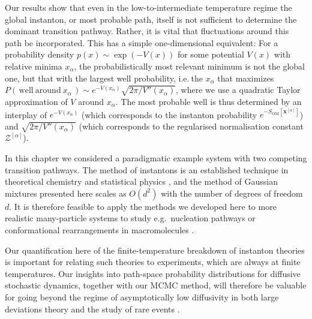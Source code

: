Our results show that even in the low-to-intermediate temperature
regime the global instanton, or most probable path, itself is not
sufficient to determine the dominant transition pathway. Rather, it
is vital that fluctuations around this path be incorporated. This
has a simple one-dimensional equivalent: For a probability density
$p(x)\sim\exp(-V(x))$ for some potential $V(x)$ with relative
minima $x_{\alpha}$, the probabilistically most relevant minimum
is not the global one, but that with the largest well probability,
i.e.$~$the $x_{\alpha}$ that maximizes $P(\,\mathrm{well~around~}x_{\alpha}\,)\sim e^{-V(x_{\alpha})}\sqrt{{2\pi}/{V''(x_{\alpha})}}$,
where we use a quadratic Taylor approximation of $V$ around $x_{\alpha}$.
The most probable well is thus determined by an interplay of $e^{-V(x_{\alpha})}$
(which corresponds to the instanton probability $e^{-S_{\text{OM}}[\mathbf{x}^{[\alpha]}]}$)
and $\sqrt{{2\pi}/{V''(x_{\alpha})}}$ (which corresponds to the regularised
normalisation constant $\mathcal{Z}^{[\alpha]}$).

In this chapter we considered a paradigmatic example system with
two competing transition pathways. The method of instantons is an
established technique in theoretical chemistry and statistical physics
\citep{eMinimumActionMethod2004a, weinanStringMethodStudy2002, grafke_instanton_2015, grafke_numerical_2019, schorlepp_gelfandyaglom_2021, dematteis_experimental_2019, ferreApproximateOptimalControls2021a, kikuchiRitzMethodTransition2020a, heymannGeometricMinimumAction2008a},
and the method of Gaussian mixtures presented here scales as $O(d^{2})$
with the number of degrees of freedom $d$. It is
therefore feasible to apply the methods we developed here to more
realistic many-particle systems to study e.g.~nucleation pathways
\citep{weinanStringMethodStudy2002, lutskoHowCrystalsForm2019a, rein_ten_wolde_numerical_1996}
or conformational rearrangements in macromolecules \citep{ren_transition_2005, fujisakiOnsagerMachlupActionbased2010a, fujisakiMultiscaleEnhancedPath2013a, gartnerModelingSimulationsPolymers2019}.

Our quantification here of the finite-temperature breakdown of instanton
theories is important for relating such theories to experiments, which
are always at finite temperatures. Our insights into path-space probability
distributions for diffusive stochastic dynamics, together with our
MCMC method, will therefore be valuable for going beyond the regime
of asymptotically low diffusivity in both large deviations theory
\citep{wentzellSmallRandomPerturbations1970, heymannGeometricMinimumAction2008a, gartnerModelingSimulationsPolymers2019}
and the study of rare events \citep{grafkeSharpAsymptoticEstimates2021}.









